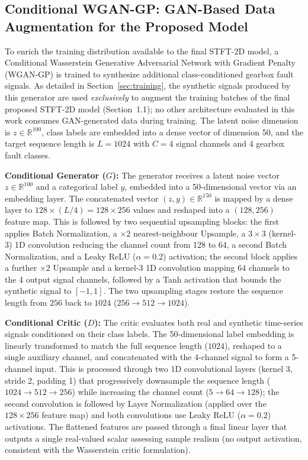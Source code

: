 \documentclass[12pt]{article}
\begin{document}
\subsection{Conditional WGAN-GP: GAN-Based Data Augmentation for the Proposed Model}
To enrich the training distribution available to the final STFT-2D model, a Conditional Wasserstein Generative Adversarial Network with Gradient Penalty (WGAN-GP) is trained to synthesize additional class-conditioned gearbox fault signals. As detailed in Section~\ref{sec:training}, the synthetic signals produced by this generator are used \emph{exclusively} to augment the training batches of the final proposed STFT-2D model (Section~1.1); no other architecture evaluated in this work consumes GAN-generated data during training. The latent noise dimension is $z \in \mathbb{R}^{100}$, class labels are embedded into a dense vector of dimension 50, and the target sequence length is $L=1024$ with $C=4$ signal channels and $4$ gearbox fault classes.

\textbf{Conditional Generator ($G$):} The generator receives a latent noise vector $z\in\mathbb{R}^{100}$ and a categorical label $y$, embedded into a 50-dimensional vector via an embedding layer. The concatenated vector $(z,y)\in\mathbb{R}^{150}$ is mapped by a dense layer to $128\times(L/4)=128\times256$ values and reshaped into a $(128, 256)$ feature map. This is followed by two sequential upsampling blocks: the first applies Batch Normalization, a $\times2$ nearest-neighbour Upsample, a $3\times3$ (kernel-3) 1D convolution reducing the channel count from 128 to 64, a second Batch Normalization, and a Leaky ReLU ($\alpha=0.2$) activation; the second block applies a further $\times2$ Upsample and a kernel-3 1D convolution mapping 64 channels to the 4 output signal channels, followed by a Tanh activation that bounds the synthetic signal to $[-1,1]$. The two upsampling stages restore the sequence length from $256$ back to $1024$ ($256\to512\to1024$).

\textbf{Conditional Critic ($D$):} The critic evaluates both real and synthetic time-series signals conditioned on their class labels. The 50-dimensional label embedding is linearly transformed to match the full sequence length ($1024$), reshaped to a single auxiliary channel, and concatenated with the 4-channel signal to form a 5-channel input. This is processed through two 1D convolutional layers (kernel 3, stride 2, padding 1) that progressively downsample the sequence length ($1024\to512\to256$) while increasing the channel count ($5\to64\to128$); the second convolution is followed by Layer Normalization (applied over the $128\times256$ feature map) and both convolutions use Leaky ReLU ($\alpha=0.2$) activations. The flattened features are passed through a final linear layer that outputs a single real-valued scalar assessing sample realism (no output activation, consistent with the Wasserstein critic formulation).
\end{document}
